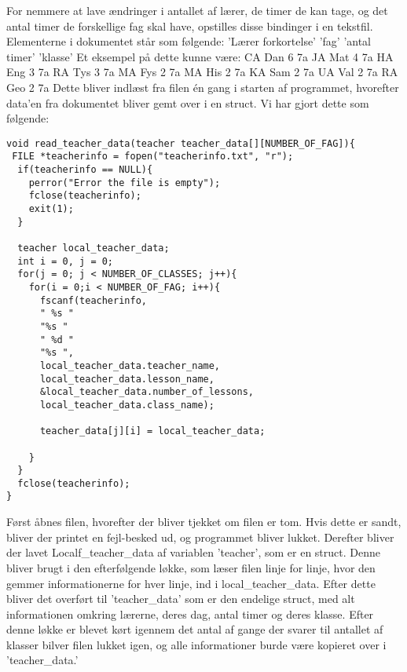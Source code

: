 For nemmere at lave ændringer i antallet af lærer, de timer de kan tage, og det antal timer de forskellige fag skal have, opstilles disse bindinger i en tekstfil. 
Elementerne i dokumentet står som følgende:
’Lærer forkortelse’ ’fag’ ’antal timer’ ’klasse’
Et eksempel på dette kunne være:
CA Dan 6 7a
JA Mat 4 7a
HA Eng 3 7a
RA Tys 3 7a
MA Fys 2 7a
MA His 2 7a
KA Sam 2 7a
UA Val 2 7a
RA Geo 2 7a
Dette bliver indlæst fra filen én gang i starten af programmet, hvorefter data’en fra dokumentet bliver gemt over i en struct.
Vi har gjort dette som følgende:
\begin{lstlisting}
void read_teacher_data(teacher teacher_data[][NUMBER_OF_FAG]){
 FILE *teacherinfo = fopen("teacherinfo.txt", "r");
  if(teacherinfo == NULL){
    perror("Error the file is empty");
    fclose(teacherinfo);
    exit(1);
  }

  teacher local_teacher_data;
  int i = 0, j = 0;
  for(j = 0; j < NUMBER_OF_CLASSES; j++){
    for(i = 0;i < NUMBER_OF_FAG; i++){
      fscanf(teacherinfo,
      " %s "
      "%s "
      " %d "
      "%s ",
      local_teacher_data.teacher_name, 
      local_teacher_data.lesson_name, 
      &local_teacher_data.number_of_lessons, 
      local_teacher_data.class_name);

      teacher_data[j][i] = local_teacher_data; 
  
    } 
  }  
  fclose(teacherinfo);
}
\end{lstlisting}
Først åbnes filen, hvorefter der bliver tjekket om filen er tom. Hvis dette er sandt, bliver der printet en fejl-besked ud, og programmet bliver lukket.
Derefter bliver der lavet Localf\_teacher\_data af variablen ’teacher’, som er en struct. Denne bliver brugt i den efterfølgende løkke, som læser filen linje for linje, hvor den gemmer informationerne for hver linje, ind i local\_teacher\_data. Efter dette bliver det overført til ’teacher\_data’ som er den endelige struct, med alt informationen omkring lærerne, deres dag, antal timer og deres klasse. 
Efter denne løkke er blevet kørt igennem det antal af gange der svarer til antallet af klasser bilver filen lukket igen, og alle informationer burde være kopieret over i ’teacher\_data.’
